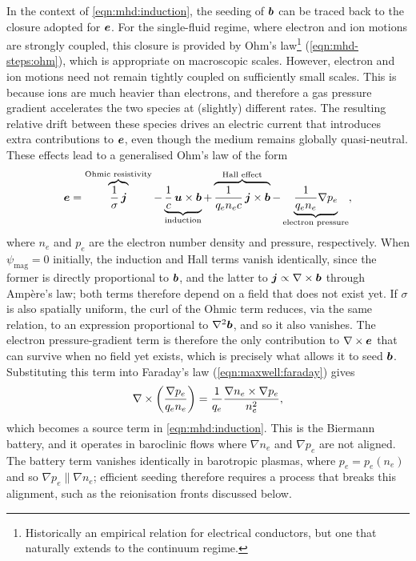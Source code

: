 In the context of \autoref{eqn:mhd:induction}, the seeding of $\bm{b}$ can be traced back to the closure adopted for $\bm{e}$. For the single-fluid regime, where electron and ion motions are strongly coupled, this closure is provided by Ohm's law\footnote{
    Historically an empirical relation for electrical conductors, but one that naturally extends to the continuum regime.
} (\autoref{eqn:mhd-steps:ohm}), which is appropriate on macroscopic scales. However, electron and ion motions need not remain tightly coupled on sufficiently small scales. This is because ions are much heavier than electrons, and therefore a gas pressure gradient accelerates the two species at (slightly) different rates. The resulting relative drift between these species drives an electric current that introduces extra contributions to $\bm{e}$, even though the medium remains globally quasi-neutral. These effects lead to a generalised Ohm's law of the form
\begin{align}
    \bm{e}
        = \overbrace{
                \frac{1}{\sigma} \,\bm{j}
            }^\text{Ohmic resistivity}
            - \underbrace{
                \frac{1}{c} \,\bm{u}\times\bm{b}
            }_\text{induction}
            + \overbrace{
                \frac{1}{q_e n_e c} \,\bm{j}\times\bm{b}
            }^\text{Hall effect}
            - \underbrace{
                \frac{1}{q_e n_e} \nabla p_e
            }_\text{electron pressure}
    ,
\end{align}
where $n_e$ and $p_e$ are the electron number density and pressure, respectively. When $\psi_\mathrm{mag} = 0$ initially, the induction and Hall terms vanish identically, since the former is directly proportional to $\bm{b}$, and the latter to $\bm{j} \propto \nabla\times\bm{b}$ through Amp\`ere's law; both terms therefore depend on a field that does not exist yet. If $\sigma$ is also spatially uniform, the curl of the Ohmic term reduces, via the same relation, to an expression proportional to $\nabla^2\bm{b}$, and so it also vanishes. The electron pressure-gradient term is therefore the only contribution to $\nabla\times\bm{e}$ that can survive when no field yet exists, which is precisely what allows it to seed $\bm{b}$. Substituting this term into Faraday's law (\autoref{eqn:maxwell:faraday}) gives
\begin{align}
    \nabla \times \left( \frac{\nabla p_e}{q_e n_e} \right)
        = \frac{1}{q_e}\frac{\nabla n_e \times \nabla p_e}{n_e^2}
    ,
\end{align}
which becomes a source term in \autoref{eqn:mhd:induction}. This is the Biermann battery, and it operates in baroclinic flows where $\nabla n_e$ and $\nabla p_e$ are not aligned. The battery term vanishes identically in barotropic plasmas, where $p_e = p_e(n_e)$ and so $\nabla p_e \parallel \nabla n_e$; efficient seeding therefore requires a process that breaks this alignment, such as the reionisation fronts discussed below.

